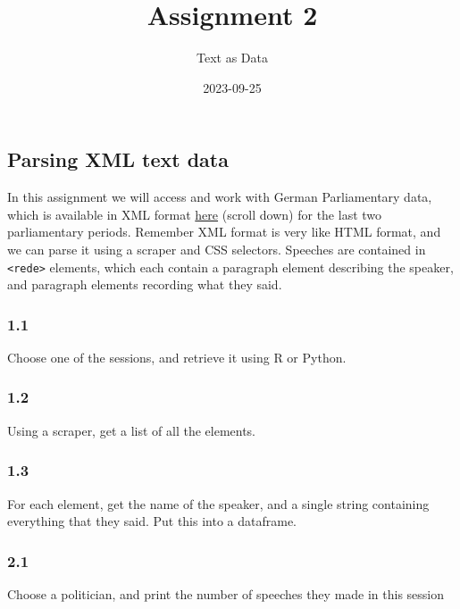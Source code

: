 \documentclass[
]{article}
\title{Assignment 2}
\author{Text as Data}
\date{2023-09-25}
\begin{document}
\maketitle

\hypertarget{parsing-xml-text-data}{%
\subsection{Parsing XML text data}\label{parsing-xml-text-data}}

In this assignment we will access and work with German Parliamentary
data, which is available in XML format
\href{https://www.bundestag.de/services/opendata}{here} (scroll down)
for the last two parliamentary periods. Remember XML format is very like
HTML format, and we can parse it using a scraper and CSS selectors.
Speeches are contained in \texttt{\textless{}rede\textgreater{}}
elements, which each contain a paragraph element describing the speaker,
and paragraph elements recording what they said.

\hypertarget{section}{%
\subsubsection{1.1}\label{section}}

Choose one of the sessions, and retrieve it using R or Python.

\hypertarget{section-1}{%
\subsubsection{1.2}\label{section-1}}

Using a scraper, get a list of all the elements.

\hypertarget{section-2}{%
\subsubsection{1.3}\label{section-2}}

For each element, get the name of the speaker, and a single string
containing everything that they said. Put this into a dataframe.

\hypertarget{section-3}{%
\subsubsection{2.1}\label{section-3}}

Choose a politician, and print the number of speeches they made in this
session
\end{document}
